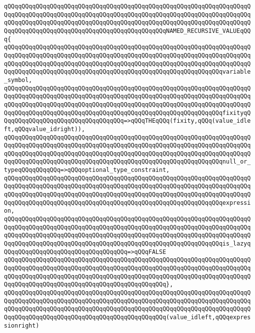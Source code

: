 \verb|qQQqqQQqqQQqqQQqqQQqqQQqqQQqqQQqqQQqqQQqqQQqqQQqqQQqqQQqqQQqqQQqqQQqqQQqqQQqqQQqqQQqqQQqqQQqqQQqqQQqqQQqqQQqqQQqqQQqqQQqqQQqqQQqqQQqqQQqqQQqqQQqqQQqqQQqqQQqqQQqqQQqqQQqqQQqqQQqqQQqqQQqqQQqqQQqqQQqqQQqqQQqqQQqqQQqqQQqqQQqqQQqqQQqqQQqqQQqqQQqqQQqqQQqqQQqqQQqNAMED_RECURSIVE_VALUEqQQq{|\newline
\verb|qQQqqQQqqQQqqQQqqQQqqQQqqQQqqQQqqQQqqQQqqQQqqQQqqQQqqQQqqQQqqQQqqQQqqQQqqQQqqQQqqQQqqQQqqQQqqQQqqQQqqQQqqQQqqQQqqQQqqQQqqQQqqQQqqQQqqQQqqQQqqQQqqQQqqQQqqQQqqQQqqQQqqQQqqQQqqQQqqQQqqQQqqQQqqQQqqQQqqQQqqQQqqQQqqQQqqQQqqQQqqQQqqQQqqQQqqQQqqQQqqQQqqQQqqQQqqQQqqQQqqQQqqQQqqQQqvariable_symbol,|\newline
\verb|qQQqqQQqqQQqqQQqqQQqqQQqqQQqqQQqqQQqqQQqqQQqqQQqqQQqqQQqqQQqqQQqqQQqqQQqqQQqqQQqqQQqqQQqqQQqqQQqqQQqqQQqqQQqqQQqqQQqqQQqqQQqqQQqqQQqqQQqqQQqqQQqqQQqqQQqqQQqqQQqqQQqqQQqqQQqqQQqqQQqqQQqqQQqqQQqqQQqqQQqqQQqqQQqqQQqqQQqqQQqqQQqqQQqqQQqqQQqqQQqqQQqqQQqqQQqqQQqqQQqqQQqqQQqqQQqfixityqQQqqQQqqQQqqQQqqQQqqQQqqQQqqQQqqQQq=>qQQqTHEqQQq(fixity,qQQq(value_idleft,qQQqvalue_idright)),|\newline
\verb|qQQqqQQqqQQqqQQqqQQqqQQqqQQqqQQqqQQqqQQqqQQqqQQqqQQqqQQqqQQqqQQqqQQqqQQqqQQqqQQqqQQqqQQqqQQqqQQqqQQqqQQqqQQqqQQqqQQqqQQqqQQqqQQqqQQqqQQqqQQqqQQqqQQqqQQqqQQqqQQqqQQqqQQqqQQqqQQqqQQqqQQqqQQqqQQqqQQqqQQqqQQqqQQqqQQqqQQqqQQqqQQqqQQqqQQqqQQqqQQqqQQqqQQqqQQqqQQqqQQqqQQqqQQqqQQqnull_or_typeqQQqqQQqqQQq=>qQQqoptional_type_constraint,|\newline
\verb|qQQqqQQqqQQqqQQqqQQqqQQqqQQqqQQqqQQqqQQqqQQqqQQqqQQqqQQqqQQqqQQqqQQqqQQqqQQqqQQqqQQqqQQqqQQqqQQqqQQqqQQqqQQqqQQqqQQqqQQqqQQqqQQqqQQqqQQqqQQqqQQqqQQqqQQqqQQqqQQqqQQqqQQqqQQqqQQqqQQqqQQqqQQqqQQqqQQqqQQqqQQqqQQqqQQqqQQqqQQqqQQqqQQqqQQqqQQqqQQqqQQqqQQqqQQqqQQqqQQqqQQqqQQqqQQqexpression,|\newline
\verb|qQQqqQQqqQQqqQQqqQQqqQQqqQQqqQQqqQQqqQQqqQQqqQQqqQQqqQQqqQQqqQQqqQQqqQQqqQQqqQQqqQQqqQQqqQQqqQQqqQQqqQQqqQQqqQQqqQQqqQQqqQQqqQQqqQQqqQQqqQQqqQQqqQQqqQQqqQQqqQQqqQQqqQQqqQQqqQQqqQQqqQQqqQQqqQQqqQQqqQQqqQQqqQQqqQQqqQQqqQQqqQQqqQQqqQQqqQQqqQQqqQQqqQQqqQQqqQQqqQQqqQQqqQQqqQQqis_lazyqQQqqQQqqQQqqQQqqQQqqQQqqQQqqQQqqQQq=>qQQqFALSE|\newline
\verb|qQQqqQQqqQQqqQQqqQQqqQQqqQQqqQQqqQQqqQQqqQQqqQQqqQQqqQQqqQQqqQQqqQQqqQQqqQQqqQQqqQQqqQQqqQQqqQQqqQQqqQQqqQQqqQQqqQQqqQQqqQQqqQQqqQQqqQQqqQQqqQQqqQQqqQQqqQQqqQQqqQQqqQQqqQQqqQQqqQQqqQQqqQQqqQQqqQQqqQQqqQQqqQQqqQQqqQQqqQQqqQQqqQQqqQQqqQQqqQQqqQQqqQQqqQQqqQQq},|\newline
\verb|qQQqqQQqqQQqqQQqqQQqqQQqqQQqqQQqqQQqqQQqqQQqqQQqqQQqqQQqqQQqqQQqqQQqqQQqqQQqqQQqqQQqqQQqqQQqqQQqqQQqqQQqqQQqqQQqqQQqqQQqqQQqqQQqqQQqqQQqqQQqqQQqqQQqqQQqqQQqqQQqqQQqqQQqqQQqqQQqqQQqqQQqqQQqqQQqqQQqqQQqqQQqqQQqqQQqqQQqqQQqqQQqqQQqqQQqqQQqqQQqqQQqqQQqqQQqqQQq(value_idleft,qQQqexpressionright)|\newline
